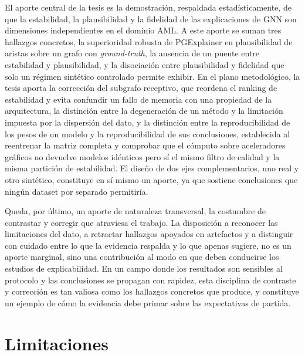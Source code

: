 El aporte central de la tesis es la demostración, respaldada estadísticamente, de que la estabilidad, la plausibilidad y la fidelidad de las explicaciones de GNN son dimensiones independientes en el dominio AML. A este aporte se suman tres hallazgos concretos, la superioridad robusta de PGExplainer en plausibilidad de aristas sobre un grafo con \textit{ground-truth}, la ausencia de un puente entre estabilidad y plausibilidad, y la disociación entre plausibilidad y fidelidad que solo un régimen sintético controlado permite exhibir. En el plano metodológico, la tesis aporta la corrección del subgrafo receptivo, que reordena el ranking de estabilidad y evita confundir un fallo de memoria con una propiedad de la arquitectura, la distinción entre la degeneración de un método y la limitación impuesta por la dispersión del dato, y la distinción entre la reproducibilidad de los pesos de un modelo y la reproducibilidad de sus conclusiones, establecida al reentrenar la matriz completa y comprobar que el cómputo sobre aceleradores gráficos no devuelve modelos idénticos pero sí el mismo filtro de calidad y la misma partición de estabilidad. El diseño de dos ejes complementarios, uno real y otro sintético, constituye en sí mismo un aporte, ya que sostiene conclusiones que ningún dataset por separado permitiría.

Queda, por último, un aporte de naturaleza transversal, la costumbre de contrastar y corregir que atraviesa el trabajo. La disposición a reconocer las limitaciones del dato, a retractar hallazgos apoyados en artefactos y a distinguir con cuidado entre lo que la evidencia respalda y lo que apenas sugiere, no es un aporte marginal, sino una contribución al modo en que deben conducirse los estudios de explicabilidad. En un campo donde los resultados son sensibles al protocolo y las conclusiones se propagan con rapidez, esta disciplina de contraste y corrección es tan valiosa como los hallazgos concretos que produce, y constituye un ejemplo de cómo la evidencia debe primar sobre las expectativas de partida.

\section{Limitaciones}

